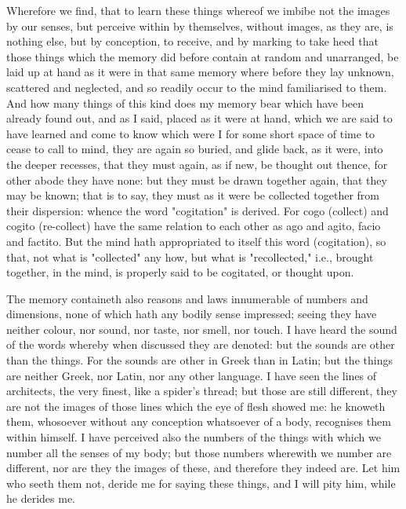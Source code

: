 \documentclass[b5paper,openright,12pt,twoside]{book}
\begin{document}
Wherefore we find, that to learn these things whereof we imbibe not the
images by our senses, but perceive within by themselves, without images,
as they are, is nothing else, but by conception, to receive, and by
marking to take heed that those things which the memory did before
contain at random and unarranged, be laid up at hand as it were in that
same memory where before they lay unknown, scattered and neglected, and
so readily occur to the mind familiarised to them. And how many things
of this kind does my memory bear which have been already found out, and
as I said, placed as it were at hand, which we are said to have learned
and come to know which were I for some short space of time to cease to
call to mind, they are again so buried, and glide back, as it were, into
the deeper recesses, that they must again, as if new, be thought out
thence, for other abode they have none: but they must be drawn together
again, that they may be known; that is to say, they must as it were be
collected together from their dispersion: whence the word "cogitation"
is derived. For cogo (collect) and cogito (re-collect) have the same
relation to each other as ago and agito, facio and factito. But the mind
hath appropriated to itself this word (cogitation), so that, not what is
"collected" any how, but what is "recollected," i.e., brought together,
in the mind, is properly said to be cogitated, or thought upon.

The memory containeth also reasons and laws innumerable of numbers and
dimensions, none of which hath any bodily sense impressed; seeing they
have neither colour, nor sound, nor taste, nor smell, nor touch. I have
heard the sound of the words whereby when discussed they are denoted:
but the sounds are other than the things. For the sounds are other in
Greek than in Latin; but the things are neither Greek, nor Latin,
nor any other language. I have seen the lines of architects, the very
finest, like a spider's thread; but those are still different, they
are not the images of those lines which the eye of flesh showed me: he
knoweth them, whosoever without any conception whatsoever of a body,
recognises them within himself. I have perceived also the numbers of the
things with which we number all the senses of my body; but those numbers
wherewith we number are different, nor are they the images of these,
and therefore they indeed are. Let him who seeth them not, deride me for
saying these things, and I will pity him, while he derides me.
\end{document}
